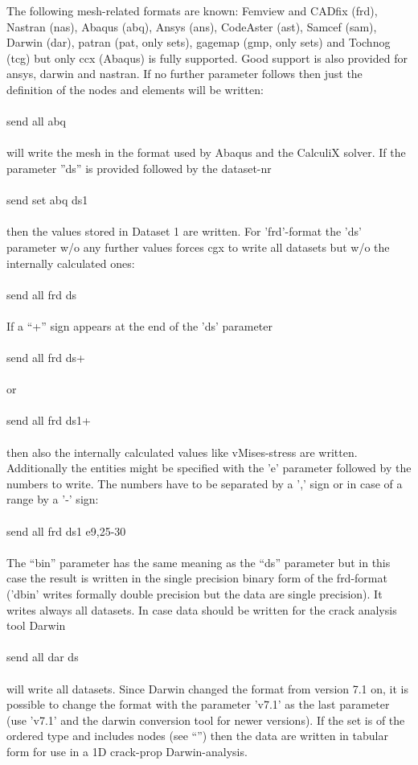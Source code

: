 \documentclass{article}
\begin{document}
The following mesh-related formats are known: Femview and CADfix (frd), Nastran (nas), Abaqus (abq), Ansys (ans), CodeAster (ast), Samcef (sam), Darwin (dar), patran (pat, only sets), gagemap (gmp, only sets) and Tochnog (tcg) but only ccx (Abaqus) is fully supported. Good support is also provided for ansys, darwin and nastran. If no further parameter follows then just the definition of the nodes and elements will be written:\\\\send all abq\\\\will write the mesh in the format used by Abaqus and the CalculiX solver. If the parameter ''ds'' is provided followed by the dataset-nr\\\\send set abq ds1\\\\then the values stored in Dataset 1 are written. For 'frd'-format the 'ds' parameter w/o any further values forces cgx to write all datasets but w/o the internally calculated ones:\\\\send all frd ds\\\\If a ``+'' sign appears at the end of the 'ds' parameter\\\\send all frd ds+\\\\or \\\\send all frd ds1+\\\\then also the internally calculated values like vMises-stress are written. Additionally the entities might be specified with the 'e' parameter followed by the numbers to write. The numbers have to be separated by a ',' sign or in case of a range by a '-' sign:\\\\send all frd ds1 e9,25-30\\\\ The ``bin'' parameter has the same meaning as the ``ds'' parameter but in this case the result is written in the single precision binary form of the frd-format ('dbin' writes formally double precision but the data are single precision). It writes always all datasets. In case data should be written for the crack analysis tool Darwin\\\\send all dar ds\\\\will write all datasets. Since Darwin changed the format from version 7.1 on, it is possible to change the format with the parameter 'v7.1' as the last parameter (use 'v7.1' and the darwin conversion tool for newer versions). If the set is of the ordered type and includes nodes (see ``'') then the data are written in tabular form for use in a 1D crack-prop Darwin-analysis.
\end{document}
